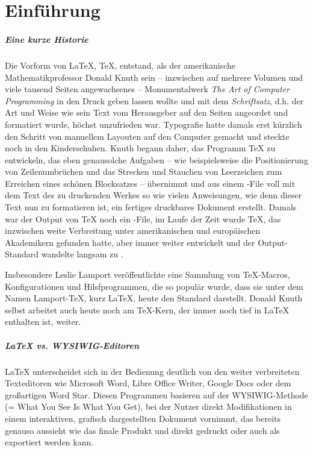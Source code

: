 \chapter{Einführung}\label{sec:introduction}

\paragraph{Eine kurze Historie}
Die Vorform von \LaTeX{}, \TeX{}, entstand, als der amerikanische Mathematikprofessor Donald Knuth sein -- inzwischen auf mehrere Volumen und viele tausend Seiten angewachsenes -- Monumentalwerk \emph{The Art of Computer Programming} in den Druck geben lassen wollte und mit dem \emph{Schriftsatz}, d.h. der Art und Weise wie sein Text vom Herausgeber auf den Seiten angeordet und formatiert wurde, höchst unzufrieden war.
Typografie hatte damals erst kürzlich den Schritt von manuellem Layouten auf den Computer gemacht und steckte noch in den Kinderschuhen.
Knuth begann daher, das Programm \TeX{} zu entwickeln, das eben genausolche Aufgaben -- wie beispielsweise die Positionierung von Zeilenumbrüchen und das Strecken und Stauchen von Leerzeichen zum Erreichen eines schönen Blocksatzes -- übernimmt und aus einem -File voll mit dem Text des zu druckenden Werkes so wie vielen Anweisungen, wie denn dieser Text nun zu formatieren ist, ein fertiges druckbares Dokument erstellt.
Damals war der Output von \TeX{} noch ein -File, im Laufe der Zeit wurde \TeX{}, das inzwischen weite Verbreitung unter amerikanischen und europäischen Akademikern gefunden hatte, aber immer weiter entwickelt und der Output-Standard wandelte langsam zu .

Insbesondere Leslie Lamport veröffentlichte eine Sammlung von \TeX{}-Macros, Konfigurationen und Hilsfprogrammen, die so populär wurde, dass sie unter dem Namen Lamport-\TeX{}, kurz \LaTeX{}, heute den Standard darstellt.
Donald Knuth selbst arbeitet auch heute noch am \TeX{}-Kern, der immer noch tief in \LaTeX{} enthalten ist, weiter.

\paragraph{\LaTeX{} vs. WYSIWIG-Editoren}
\LaTeX{} unterscheidet sich in der Bedienung deutlich von den weiter verbreiteten Texteditoren wie Microsoft Word, Libre Office Writer, Google Docs oder dem großartigen Word Star.
Diesen Programmen basieren auf der WYSIWIG-Methode (= What You See Is What You Get), bei der Nutzer direkt Modifikationen in einem interaktiven, grafisch dargestellten Dokument vornimmt, das bereits genauso aussieht wie das finale Produkt und direkt gedruckt oder auch als  exportiert werden kann.

